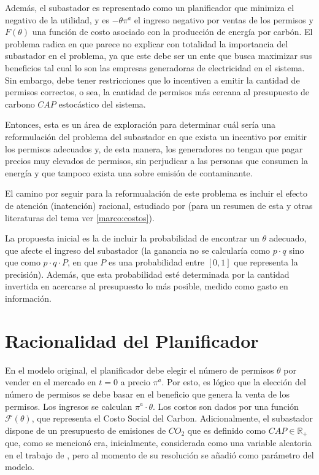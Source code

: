 Además, el subastador es representado como un planificador que minimiza el negativo de la utilidad, y es $-\theta \pi^a$ el ingreso negativo por ventas de los permisos y $F(\theta)$ una función de costo asociado con la producción de energía por carbón. El problema radica en que parece no explicar con totalidad la importancia del subastador en el problema, ya que este debe ser un ente que busca maximizar sus beneficios tal cual  lo son las empresas generadoras de electricidad en el sistema. Sin embargo, debe tener restricciones que lo incentiven a emitir la cantidad de permisos correctos, o sea, la cantidad de permisos más cercana al presupuesto de carbono $CAP$ estocástico del sistema.
\vspace{2.5mm}

Entonces, esta es un área de exploración para determinar cuál sería una reformulación del problema del subastador en que exista un incentivo por emitir los permisos adecuados y, de esta manera, los generadores no tengan que pagar precios muy elevados de permisos, sin perjudicar a las personas que consumen la energía y que tampoco exista una sobre emisión de contaminante.
\vspace{2.5mm}

El camino por seguir para la reformualación de este problema es incluir el efecto de atención (inatención) racional, estudiado por  (para un resumen de esta y otras literaturas del tema ver \ref{marco:costos}).
\vspace{2.5mm}

La propuesta inicial es la de incluir la probabilidad de encontrar un $\theta$ adecuado, que afecte el ingreso del subastador (la ganancia no se calcularía como $p\cdot q$ sino que como $p\cdot q\cdot P$, en que $P$ es una probabilidad entre $[0,1]$ que representa la precisión). Además, que esta probabilidad esté determinada por la cantidad invertida en acercarse al presupuesto lo más posible, medido como gasto en información.

\section{Racionalidad del Planificador}

En el modelo original, el planificador debe elegir el número de permisos $\theta$ por vender en el mercado en $t=0$ a precio $\pi^a$. Por esto, es lógico que la elección del número de permisos se debe basar en el beneficio que genera la venta de los permisos. Los ingresos se calculan $\pi^a\cdot\theta$. Los costos son dados por una función $\mathcal{F}(\theta)$, que representa el Costo Social del Carbon. Adicionalmente, el subastador dispone de un presupuesto de emisiones de $CO_2$ que es definido como $CAP\in\mathbb{R}_+$ que, como se mencionó era, inicialmente, considerada como una variable aleatoria en el trabajo de , pero al momento de su resolución se añadió como parámetro del modelo. 
\vspace{2.5mm}

